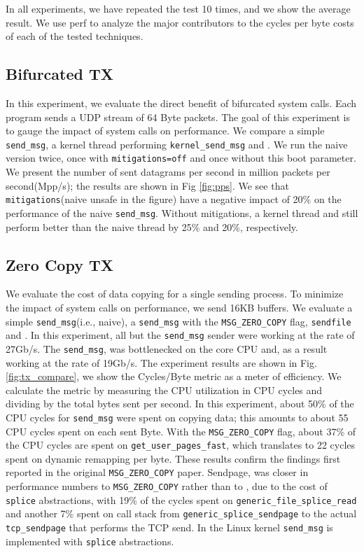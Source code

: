 In all experiments, we have repeated the test 10 times, and we show the average result. We use perf\cite{perf} to analyze the major contributors to the cycles per byte costs of each of the tested techniques.

\subsection{Bifurcated TX}\label{sec:eval_bif}
In this experiment, we evaluate the direct benefit of bifurcated system calls. Each program sends a UDP stream of 64 Byte packets. The goal of this experiment is to gauge the impact of system calls on performance. We compare a simple \texttt{send\_msg}, a kernel thread performing \texttt{kernel\_send\_msg} and \oursys. We run the naive version twice, once with \texttt{mitigations=off}\cite{mitigations} and once without this boot parameter. We present the number of sent datagrams per second in million packets per second(Mpp/s); the results are shown in Fig \ref{fig:pps}. We see that \texttt{mitigations}(naive unsafe in the figure) have a negative impact of 20\% on the performance of the naive \texttt{send\_msg}. Without mitigations, a kernel thread and \oursys still perform better than the naive thread by 25\% and 20\%, respectively.

\subsection{Zero Copy TX}
We evaluate the cost of data copying for a single sending process. To minimize the impact of system calls on performance, we send 16KB buffers. We evaluate a simple \texttt{send\_msg}(i.e., naive), a \texttt{send\_msg} with the \texttt{MSG\_ZERO\_COPY} flag, \texttt{sendfile} and \oursys. In this experiment, all but the  \texttt{send\_msg} sender were working at the rate of 27Gb/s. The \texttt{send\_msg}, was bottlenecked on the core CPU and, as a result working at the rate of 19Gb/s. The experiment results are shown in Fig. \ref{fig:tx_compare}, we show the Cycles/Byte metric as a meter of efficiency. We calculate the metric by measuring the CPU utilization in CPU cycles and dividing by the total bytes sent per second. In this experiment, about 50\% of the CPU cycles for \texttt{send\_msg} were spent on copying data; this amounts to about 55 CPU cycles spent on each sent Byte.%
With the \texttt{MSG\_ZERO\_COPY} flag, about 37\% of the CPU cycles are spent on \texttt{get\_user\_pages\_fast}, which translates to 22 cycles spent on dynamic remapping per byte. These results confirm the findings first reported in the original \texttt{MSG\_ZERO\_COPY} paper\cite{desendmsg}. Sendpage, was closer in performance numbers to \texttt{MSG\_ZERO\_COPY} rather than to \oursys, due to the cost of \texttt{splice} abstractions, with 19\% of the cycles spent on \texttt{generic\_file\_splice\_read} and another 7\% spent on call stack from \texttt{generic\_splice\_sendpage} to the actual \texttt{tcp\_sendpage} that performs the TCP send. In the Linux kernel \texttt{send\_msg} is implemented with \texttt{splice} abstractions.

